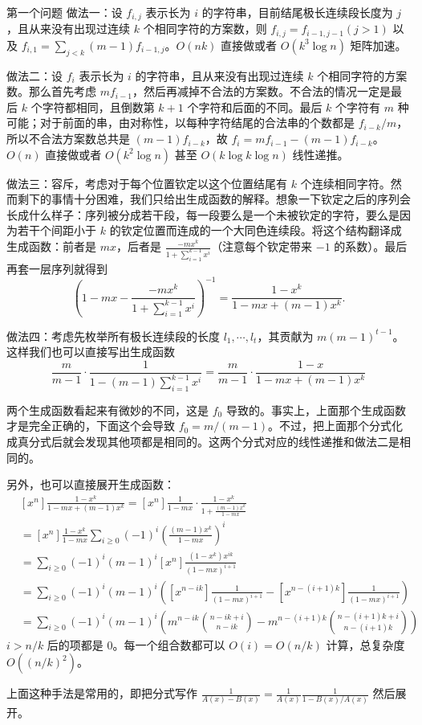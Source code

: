 \begin{frame}{第一个问题}
    做法一：设 $f_{i,j}$ 表示长为 $i$ 的字符串，目前结尾极长连续段长度为 $j$，且从来没有出现过连续 $k$ 个相同字符的方案数，则 $f_{i,j}=f_{i-1,j-1}(j>1)$ 以及 $f_{i,1}=\sum_{j<k} (m-1)f_{i-1,j}$。$O(nk)$ 直接做或者 $O(k^3\log n)$ 矩阵加速。

    做法二：设 $f_i$ 表示长为 $i$ 的字符串，且从来没有出现过连续 $k$ 个相同字符的方案数。那么首先考虑 $mf_{i-1}$，然后再减掉不合法的方案数。不合法的情况一定是最后 $k$ 个字符都相同，且倒数第 $k+1$ 个字符和后面的不同。最后 $k$ 个字符有 $m$ 种可能；对于前面的串，由对称性，以每种字符结尾的合法串的个数都是 $f_{i-k}/m$，所以不合法方案数总共是 $(m-1)f_{i-k}$，故 $f_i=mf_{i-1}-(m-1)f_{i-k}$。$O(n)$ 直接做或者 $O(k^2\log n)$ 甚至 $O(k\log k\log n)$ 线性递推。
\end{frame}
\begin{frame}
    做法三：容斥，考虑对于每个位置钦定以这个位置结尾有 $k$ 个连续相同字符。然而剩下的事情十分困难，我们只给出生成函数的解释。想象一下钦定之后的序列会长成什么样子：序列被分成若干段，每一段要么是一个未被钦定的字符，要么是因为若干个间距小于 $k$ 的钦定位置而连成的一个大同色连续段。将这个结构翻译成生成函数：前者是 $mx$，后者是 $\frac{-mx^k}{1+\sum_{i=1}^{k-1}x^i}$（注意每个钦定带来 $-1$ 的系数）。最后再套一层序列就得到
    $$
    \left(1-mx-\frac{-mx^k}{1+\sum_{i=1}^{k-1}x^i}\right)^{-1}=\frac{1-x^k}{1-mx+(m-1)x^k}.
    $$

    做法四：考虑先枚举所有极长连续段的长度 $l_1,\cdots,l_t$，其贡献为 $m(m-1)^{t-1}$。这样我们也可以直接写出生成函数 
    $$
    \frac{m}{m-1}\cdot \frac{1}{1-(m-1)\sum_{i=1}^{k-1}x^i}=\frac{m}{m-1}\cdot \frac{1-x}{1-mx+(m-1)x^k}
    $$

    两个生成函数看起来有微妙的不同，这是 $f_0$ 导致的。事实上，上面那个生成函数才是完全正确的，下面这个会导致 $f_0=m/(m-1)$。不过，把上面那个分式化成真分式后就会发现其他项都是相同的。这两个分式对应的线性递推和做法二是相同的。
\end{frame}
\begin{frame}
    另外，也可以直接展开生成函数：
    $$
    \begin{aligned}
    &[x^n]\frac{1-x^k}{1-mx+(m-1)x^k}=[x^n]\frac{1}{1-mx}\cdot \frac{1-x^k}{1+\frac{(m-1)x^k}{1-mx}}\\
    &=[x^n]\frac{1-x^k}{1-mx}\sum_{i\ge 0}(-1)^i\left(\frac{(m-1)x^k}{1-mx}\right)^i\\
    &=\sum_{i\ge 0}(-1)^i(m-1)^i[x^n]\frac{(1-x^k)x^{ik}}{(1-mx)^{i+1}}\\
    &=\sum_{i\ge 0}(-1)^i(m-1)^i\left([x^{n-ik}]\frac{1}{(1-mx)^{i+1}}-[x^{n-(i+1)k}]\frac{1}{(1-mx)^{i+1}}\right)\\
    &=\sum_{i\ge 0}(-1)^i(m-1)^i\left(m^{n-ik}\binom{n-ik+i}{n-ik}-m^{n-(i+1)k}\binom{n-(i+1)k+i}{n-(i+1)k}\right)
    \end{aligned}
    $$
    $i>n/k$ 后的项都是 $0$。每一个组合数都可以 $O(i)=O(n/k)$ 计算，总复杂度 $O((n/k)^2)$。

    上面这种手法是常用的，即把分式写作 $\frac{1}{A(x)-B(x)}=\frac{1}{A(x)}\frac{1}{1-B(x)/A(x)}$ 然后展开。
\end{frame}
